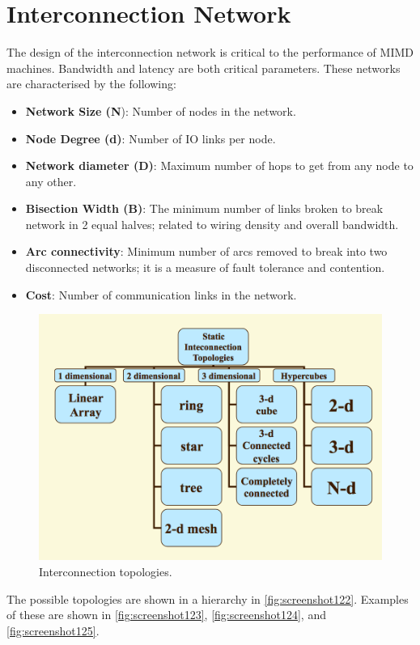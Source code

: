 \section{Interconnection Network}
The design of the interconnection network is critical to the performance of MIMD machines. Bandwidth and latency are both critical parameters. These networks are characterised by the following: \begin{itemize}
\item \textbf{Network Size (N}): Number of nodes in the network.
\item \textbf{Node Degree (d)}: Number of IO links per node.
\item \textbf{Network diameter (D)}: Maximum number of hops to get from any node to any other.
\item \textbf{Bisection Width (B)}: The minimum number of links broken to break network in 2 equal halves; related to wiring density and overall bandwidth.
\item \textbf{Arc connectivity}: Minimum number of arcs removed to break into two disconnected networks; it is a measure of fault tolerance and contention.
\item \textbf{Cost}: Number of communication links in the network.
\end{itemize}

\begin{figure}
\centering
\includegraphics[width=0.7\linewidth]{figures/screenshot122}
\caption{Interconnection topologies.}
\label{fig:screenshot122}
\end{figure}

The possible topologies are shown in a hierarchy in \autoref{fig:screenshot122}. Examples of these are shown in \autoref{fig:screenshot123}, \autoref{fig:screenshot124}, and \autoref{fig:screenshot125}.

